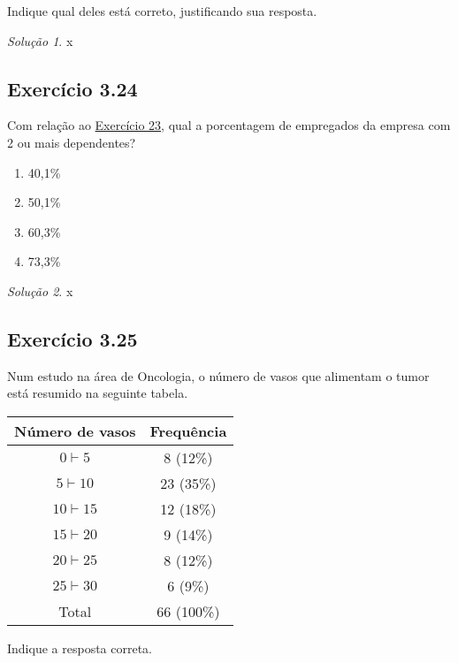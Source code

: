 \documentclass[
]{latex/krantz}
\providecommand{\tightlist}{%
  \setlength{\itemsep}{0pt}\setlength{\parskip}{0pt}}
\theoremstyle{definition}
\theoremstyle{definition}
\theoremstyle{definition}
\theoremstyle{definition}
\theoremstyle{remark}
\newtheorem*{solution}{Solução}
\begin{document}
Indique qual deles está correto, justificando sua resposta.

\begin{solution}
x
\end{solution}

\hypertarget{exr3-24}{%
\subsection*{Exercício 3.24}\label{exr3-24}}

Com relação ao \protect\hyperlink{exr3-23}{Exercício 23}, qual a porcentagem de empregados da empresa com 2 ou mais dependentes?

\begin{enumerate}
\def\labelenumi{\alph{enumi})}
\tightlist
\item
  40,1\%
\item
  50,1\%
\item
  60,3\%
\item
  73,3\%
\end{enumerate}

\begin{solution}
x
\end{solution}

\hypertarget{exr3-25}{%
\subsection*{Exercício 3.25}\label{exr3-25}}

Num estudo na área de Oncologia, o número de vasos que alimentam o tumor está resumido na seguinte tabela.

\begin{longtable}[]{@{}cc@{}}
\toprule\noalign{}
Número de vasos & Frequência \\
\midrule\noalign{}
\endhead
\bottomrule\noalign{}
\endlastfoot
\(0 \vdash 5\) & 8 (12\%) \\
\(5 \vdash 10\) & 23 (35\%) \\
\(10 \vdash 15\) & 12 (18\%) \\
\(15 \vdash 20\) & 9 (14\%) \\
\(20 \vdash 25\) & 8 (12\%) \\
\(25 \vdash 30\) & 6 (9\%) \\
Total & 66 (100\%) \\
\end{longtable}

Indique a resposta correta.
\end{document}
